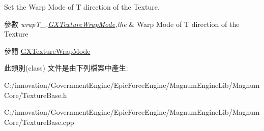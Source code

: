 Set the Warp Mode of T direction of the Texture. 


\begin{DoxyParams}{參數}
{\em wrap\+T\+\_\+,\hyperlink{class_i_dream_sky_1_1_g_x_texture_wrap_mode}{G\+X\+Texture\+Wrap\+Mode},the} & Warp Mode of T direction of the Texture \\
\hline
\end{DoxyParams}
\begin{DoxySeeAlso}{參閱}
\hyperlink{class_i_dream_sky_1_1_g_x_texture_wrap_mode}{G\+X\+Texture\+Wrap\+Mode} 
\end{DoxySeeAlso}


此類別(class) 文件是由下列檔案中產生\+:\begin{DoxyCompactItemize}
\item 
C\+:/innovation/\+Government\+Engine/\+Epic\+Force\+Engine/\+Magnum\+Engine\+Lib/\+Magnum\+Core/Texture\+Base.\+h\item 
C\+:/innovation/\+Government\+Engine/\+Epic\+Force\+Engine/\+Magnum\+Engine\+Lib/\+Magnum\+Core/Texture\+Base.\+cpp\end{DoxyCompactItemize}
